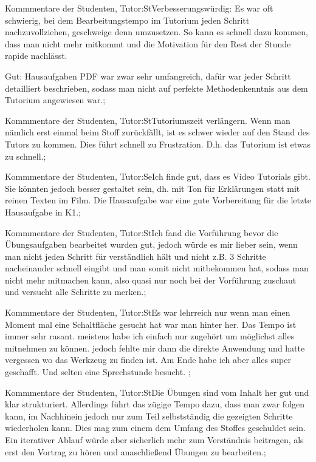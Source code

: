 \documentclass[10pt]{beamer}
\begin{document}
\begin{frame}[fragile]{Kommmentare der Studenten, Tutor:St}Verbesserungswürdig: Es war oft schwierig, bei dem Bearbeitungstempo im Tutorium jeden Schritt nachzuvollziehen, geschweige denn umzusetzen. So kann es schnell dazu kommen, dass man nicht mehr mitkommt und die Motivation für den Rest der Stunde rapide nachlässt.
 
 Gut: Hausaufgaben PDF war zwar sehr umfangreich, dafür war jeder Schritt detailliert beschrieben, sodass man nicht auf perfekte Methodenkenntnis aus dem Tutorium angewiesen war.;
 \end{frame}
\begin{frame}[fragile]{Kommmentare der Studenten, Tutor:St}Tutoriumszeit verlängern. Wenn man nämlich erst einmal beim Stoff zurückfällt, ist es schwer wieder auf den Stand des Tutors zu kommen. Dies führt schnell zu Frustration. D.h. das Tutorium ist etwas zu schnell.;
 \end{frame}
\begin{frame}[fragile]{Kommmentare der Studenten, Tutor:Se}Ich finde gut, dass es Video Tutorials gibt. Sie könnten jedoch besser gestaltet sein, dh. mit Ton für Erklärungen statt mit reinen Texten im Film. Die Hausaufgabe war eine gute Vorbereitung für die letzte Hausaufgabe in K1.;
 \end{frame}
\begin{frame}[fragile]{Kommmentare der Studenten, Tutor:St}Ich fand die Vorführung bevor die Übungsaufgaben bearbeitet wurden gut, jedoch würde es mir lieber sein, wenn man nicht jeden Schritt für verständlich hält und nicht z.B. 3 Schritte nacheinander schnell eingibt und man somit nicht mitbekommen hat, sodass man nicht mehr mitmachen kann, also quasi nur noch bei der Vorführung zuschaut und versucht alle Schritte zu merken.;
 \end{frame}
\begin{frame}[fragile]{Kommmentare der Studenten, Tutor:St}Es war lehrreich nur wenn man einen Moment mal eine Schaltfläche gesucht hat war man hinter her. Das Tempo ist immer sehr rasant. meistens habe ich einfach nur zugehört um möglichst alles mitnehmen zu können. jedoch fehlte mir dann die direkte Anwendung und hatte vergessen wo das Werkzeug zu finden ist.
 Am Ende habe ich aber alles super geschafft. Und selten eine Sprechstunde besucht.
 ;
 \end{frame}
\begin{frame}[fragile]{Kommmentare der Studenten, Tutor:St}Die Übungen sind vom Inhalt her gut und klar strukturiert. Allerdings führt das zügige Tempo dazu, dass man zwar folgen kann, im Nachhinein jedoch nur zum Teil selbstständig die gezeigten Schritte wiederholen kann. Dies mag zum einem dem Umfang des Stoffes geschuldet sein. Ein iterativer Ablauf würde aber sicherlich mehr zum Verständnis beitragen, als erst den Vortrag zu hören und anaschließend Übungen zu bearbeiten.;
 \end{frame}
\end{document}
